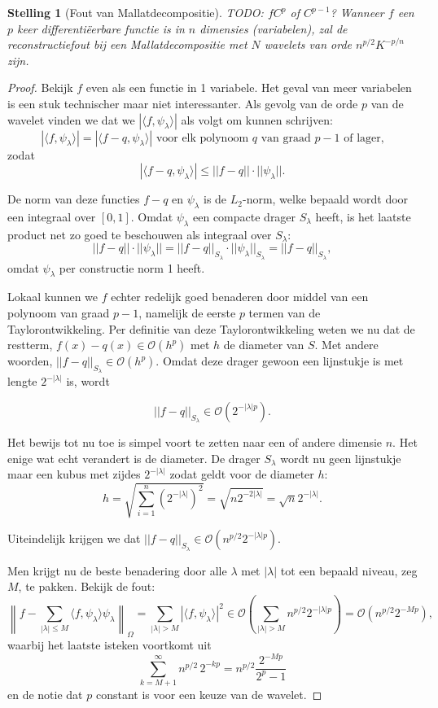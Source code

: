 \documentclass[11pt]{amsart}
\newtheorem*{stelling}{Stelling}
\begin{document}
\begin{stelling}[Fout van Mallatdecompositie]
TODO: $f C^{p}$ of $C^{p-1}$?
Wanneer $f$ een $p$ keer differenti\"eerbare functie is in $n$ dimensies (variabelen), zal de reconstructiefout bij een Mallatdecompositie met $N$ wavelets van orde $n^{p/2} K^{-p/n}$ zijn.
\end{stelling}
\begin{proof}
Bekijk $f$ even als een functie in 1 variabele. Het geval van meer variabelen is een stuk technischer maar niet interessanter.
Als gevolg van de orde $p$ van de wavelet vinden we dat we $|\langle f, \psi_\lambda\rangle |$ als volgt om kunnen schrijven:
\[
	|\langle f, \psi_\lambda \rangle | = |\langle f-q, \psi_\lambda \rangle | \text{ voor elk polynoom $q$ van graad $p-1$ of lager,} 
\]
zodat
\[
	|\langle f-q, \psi_\lambda \rangle | \leq ||f-q|| \cdot ||\psi_\lambda||.
\]

De norm van deze functies $f-q$ en $\psi_\lambda$ is de $L_2$-norm, welke bepaald wordt door een integraal over $[0,1]$. Omdat $\psi_\lambda$ een compacte drager $S_\lambda$ heeft, is het laatste product net zo goed te beschouwen als integraal over $S_\lambda$:
\[
	||f-q|| \cdot ||\psi_\lambda|| = ||f-q||_{S_\lambda} \cdot ||\psi_\lambda||_{S_\lambda} = ||f-q||_{S_\lambda},
\]
omdat $\psi_\lambda$ per constructie norm 1 heeft.

Lokaal kunnen we $f$ echter redelijk goed benaderen door middel van een polynoom van graad $p-1$, namelijk de eerste $p$ termen van de Taylorontwikkeling. Per definitie van deze Taylorontwikkeling weten we nu dat de restterm, $f(x)-q(x) \in \mathcal{O}(h^p)$ met $h$ de diameter van $S$.\cite[\S 31.\{3,4\}]{TODOross} Met andere woorden, $||f-q||_{S_\lambda} \in \mathcal{O}(h^p)$. Omdat deze drager gewoon een lijnstukje is met lengte $2^{-|\lambda|}$ is, wordt 

\[
	||f-q||_{S_\lambda} \in \mathcal{O}(2^{-|\lambda| p}).
\]

Het bewijs tot nu toe is simpel voort te zetten naar een of andere dimensie $n$. Het enige wat echt verandert is de diameter. De drager $S_\lambda$ wordt nu geen lijnstukje maar een kubus met zijdes $2^{-|\lambda|}$ zodat geldt voor de diameter $h$:
\[
	h = \sqrt{\sum_{i=1}^n (2^{-|\lambda|})^2} = \sqrt{n 2^{-2|\lambda|}} = \sqrt{n} 2^{-|\lambda|}.
\]

Uiteindelijk krijgen we dat $||f-q||_{S_\lambda} \in \mathcal{O}(n^{p/2} 2^{-|\lambda|p})$.

Men krijgt nu de beste benadering door alle $\lambda$ met $|\lambda|$ tot een bepaald niveau, zeg $M$, te pakken. Bekijk de fout:
\[
	\left\| f - \sum_{|\lambda| \leq M} \langle f, \psi_\lambda \rangle \psi_\lambda \right\|_\Omega = \sum_{|\lambda| > M} | \langle f, \psi_\lambda \rangle |^2 \in \mathcal{O}\left(\sum_{|\lambda| > M} n^{p/2} 2^{-|\lambda|p} \right) = \mathcal{O}(n^{p/2}2^{-Mp}),
\]
waarbij het laatste isteken voortkomt uit
\[
	\sum_{k=M+1}^\infty n^{p/2} \, 2^{- kp} = n^{p/2} \frac{2^{-Mp}}{2^p-1}
\]
en de notie dat $p$ constant is voor een keuze van de wavelet.


\end{proof}
\end{document}
